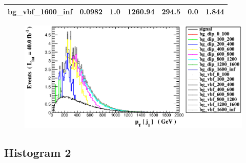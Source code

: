 \documentclass[a4paper, 10pt]{article}
\begin{document}
\begin{table}[H]
\begin{center}
\begin{tabular}{|m{23.0mm}|m{23.0mm}|m{18.0mm}|m{19.0mm}|m{19.0mm}|m{19.0mm}|m{19.0mm}|}
      \hline
      {\cellcolor{white}         bg\_vbf\_1600\_inf}& {\cellcolor{white}         0.0982}& {\cellcolor{white}         1.0}& {\cellcolor{white}         1260.94}& {\cellcolor{white}         294.5}& {\cellcolor{green}         0.0}& {\cellcolor{green}         1.844}\\
\hline
    \end{tabular}
  \end{center}
\end{table}

\begin{figure}[H]
  \begin{center}
    \includegraphics[scale=0.45]{selection_0.eps}\\
\caption{   }
  \end{center}
\end{figure}
      \newpage
\subsection{ Histogram 2}
\end{document}
